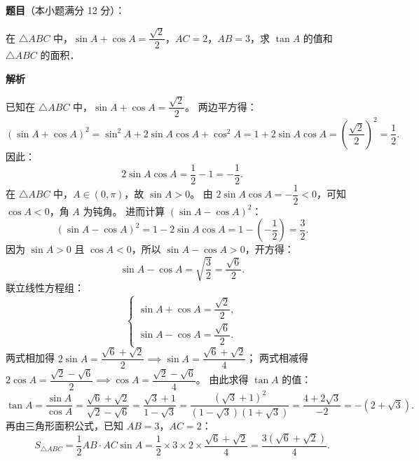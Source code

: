 \begin{answer}

\textbf{题目}（本小题满分 12 分）：

在 $\triangle ABC$ 中，$\sin A+\cos A=\dfrac{\sqrt{2}}{2}$，$AC=2$，$AB=3$，求 $\tan A$ 的值和 $\triangle ABC$ 的面积．

\textbf{解析}

已知在 $\triangle ABC$ 中，$\sin A+\cos A=\dfrac{\sqrt{2}}{2}$。
两边平方得：
\nopagebreak[4]
\[
(\sin A+\cos A)^2=\sin^2 A+2\sin A\cos A+\cos^2 A=1+2\sin A\cos A=\left(\frac{\sqrt{2}}{2}\right)^2=\frac{1}{2}.
\]
因此：
\nopagebreak[4]
\[
2\sin A\cos A=\frac{1}{2}-1=-\frac{1}{2}.
\]
在 $\triangle ABC$ 中，$A\in(0, \pi)$，故 $\sin A>0$。
由 $2\sin A\cos A=-\dfrac{1}{2}<0$，可知 $\cos A<0$，角 $A$ 为钝角。
进而计算 $(\sin A-\cos A)^2$：
\nopagebreak[4]
\[
(\sin A-\cos A)^2=1-2\sin A\cos A=1-\left(-\frac{1}{2}\right)=\frac{3}{2}.
\]
因为 $\sin A>0$ 且 $\cos A<0$，所以 $\sin A-\cos A>0$，开方得：
\nopagebreak[4]
\[
\sin A-\cos A=\sqrt{\frac{3}{2}}=\frac{\sqrt{6}}{2}.
\]
联立线性方程组：
\nopagebreak[4]
\[
\begin{cases}
\sin A+\cos A=\dfrac{\sqrt{2}}{2}, \\
\sin A-\cos A=\dfrac{\sqrt{6}}{2}.
\end{cases}
\]
两式相加得 $2\sin A=\dfrac{\sqrt{6}+\sqrt{2}}{2}\implies \sin A=\dfrac{\sqrt{6}+\sqrt{2}}{4}$；
两式相减得 $2\cos A=\dfrac{\sqrt{2}-\sqrt{6}}{2}\implies \cos A=\dfrac{\sqrt{2}-\sqrt{6}}{4}$。
由此求得 $\tan A$ 的值：
\nopagebreak[4]
\[
\tan A=\frac{\sin A}{\cos A}=\frac{\sqrt{6}+\sqrt{2}}{\sqrt{2}-\sqrt{6}}=\frac{\sqrt{3}+1}{1-\sqrt{3}}=\frac{(\sqrt{3}+1)^2}{(1-\sqrt{3})(1+\sqrt{3})}=\frac{4+2\sqrt{3}}{-2}=-(2+\sqrt{3}).
\]
再由三角形面积公式，已知 $AB=3$，$AC=2$：
\nopagebreak[4]
\[
S_{\triangle ABC}=\frac{1}{2}AB\cdot AC\sin A=\frac{1}{2}\times 3\times 2\times\frac{\sqrt{6}+\sqrt{2}}{4}=\frac{3(\sqrt{6}+\sqrt{2})}{4}.
\]


\end{answer}
